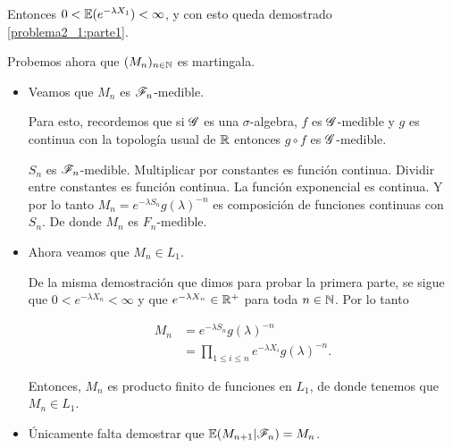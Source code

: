     Entonces $0 < \mathbb{E}(e^{-\lambda X_1}) < \infty$, y con esto queda demostrado \eqref{problema2_1:parte1}.\pn
    
    Probemos ahora que $(M_n)_{n \in \mathbb{N}}$ es martingala.
    
    \begin{itemize}
        \item 
            Veamos que $M_n$ es $\mathscr{F}_n$-medible.\pn
            
            Para esto, recordemos que si $\mathscr{G}$ es una $\sigma$-algebra, $f$ es $\mathscr{G}$-medible y $g$ es continua
            con la topología usual de $\mathbb{R}$ entonces $g \circ f$ es $\mathscr{G}$-medible.\pn
            
            $S_n$ es $\mathscr{F}_n$-medible. Multiplicar por constantes es función continua. Dividir entre constantes 
            es función continua. La función exponencial es continua. Y por lo tanto $M_n=e^{-\lambda S_n}g(\lambda)^{-n}$ 
            es composición de funciones continuas con $S_n$. De donde $M_n$ es $F_n$-medible.\pn
         
        \item 
            Ahora veamos que $M_n \in L_1$.\pn
            
            De la misma demostración que dimos para probar la primera parte, se sigue 
            que $0 < e^{-\lambda X_n} < \infty$ y que $e^{-\lambda X_n} \in \mathbb{R}^+$ para toda $n \in \mathbb{N}$. Por lo tanto
            
            \begin{align}
                M_n         &=      e^{-\lambda S_n}g(\lambda)^{-n} \\
                            &=      \prod_{1 \leq i \leq n} e^{-\lambda X_i} g(\lambda)^{-n}. 
            \end{align}\pn
            
            Entonces, $M_n$ es producto finito de funciones en $L_1$, de donde tenemos que $M_n \in L_1$.\pn
            
         \item
            Únicamente falta demostrar que $\mathbb{E}(M_{n+1} | \mathscr{F}_n) = M_n$.\pn
            

\end{itemize}
